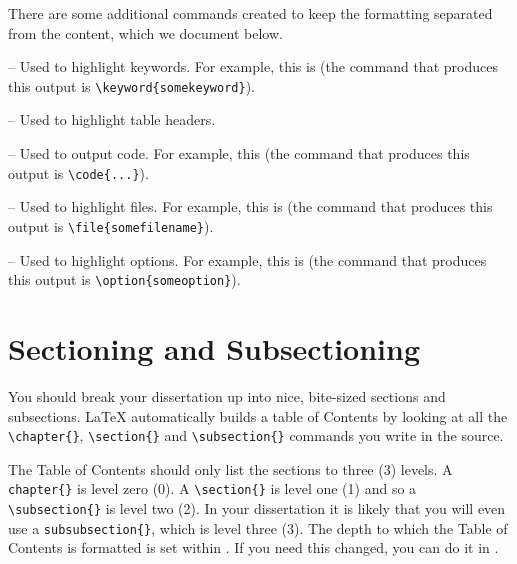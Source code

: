 There are some additional commands created to keep the formatting separated from the content, which we document below.

 -- Used to highlight keywords. For example, this is  (the command that produces this output is \verb|\keyword{somekeyword}|).

 -- Used to highlight table headers. 

 -- Used to output code. For example, this  (the command that produces this output is \verb|\code{...}|).

 -- Used to highlight files. For example, this is  (the command that produces this output is \verb|\file{somefilename}|).

 -- Used to highlight options. For example, this is  (the command that produces this output is \verb|\option{someoption}|).


\section{Sectioning and Subsectioning}

You should break your dissertation up into nice, bite-sized sections and subsections. \LaTeX{} automatically builds a table of Contents by looking at all the \verb|\chapter{}|, \verb|\section{}|  and \verb|\subsection{}| commands you write in the source.

The Table of Contents should only list the sections to three (3) levels. A \verb|chapter{}| is level zero (0). A \verb|\section{}| is level one (1) and so a \verb|\subsection{}| is level two (2). In your dissertation it is likely that you will even use a \verb|subsubsection{}|, which is level three (3). The depth to which the Table of Contents is formatted is set within . If you need this changed, you can do it in .

